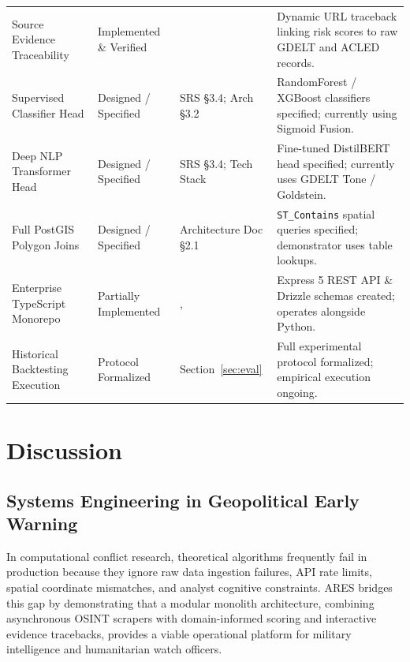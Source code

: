 \documentclass[preprint,12pt]{elsarticle}
\begin{document}
\begin{xltabular}{\textwidth}{>{\raggedright\arraybackslash{}\hsize}X >{\raggedright\arraybackslash{}\hsize}X >{\raggedright\arraybackslash{}\hsize}X >{\raggedright\arraybackslash{}\hsize}X}
Source Evidence Traceability & Implemented \& Verified &  & Dynamic URL traceback linking risk scores to raw GDELT and ACLED records. \\
Supervised Classifier Head & Designed / Specified & SRS \S3.4; Arch \S3.2 & RandomForest / XGBoost classifiers specified; currently using Sigmoid Fusion. \\
Deep NLP Transformer Head & Designed / Specified & SRS \S3.4; Tech Stack & Fine-tuned DistilBERT head specified; currently uses GDELT Tone / Goldstein. \\
Full PostGIS Polygon Joins & Designed / Specified & Architecture Doc \S2.1 & \texttt{ST\_Contains} spatial queries specified; demonstrator uses table lookups. \\
Enterprise TypeScript Monorepo & Partially Implemented & ,  & Express 5 REST API \& Drizzle schemas created; operates alongside Python. \\
Historical Backtesting Execution & Protocol Formalized & Section~\ref{sec:eval} & Full experimental protocol formalized; empirical execution ongoing. \\
\end{xltabular}

\section{Discussion}
\label{sec:discussion}

\subsection{Systems Engineering in Geopolitical Early Warning}
In computational conflict research, theoretical algorithms frequently fail in production because they ignore raw data ingestion failures, API rate limits, spatial coordinate mismatches, and analyst cognitive constraints. ARES bridges this gap by demonstrating that a modular monolith architecture, combining asynchronous OSINT scrapers with domain-informed scoring and interactive evidence tracebacks, provides a viable operational platform for military intelligence and humanitarian watch officers.
\end{document}
